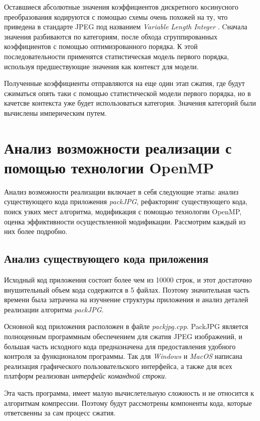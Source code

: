\documentclass{matmex-diploma-custom}
\begin{document}
Оставшиеся абсолютные значения коэффициентов дискретного косинусного преобразования кодируются с помощью схемы очень похожей на ту, что  приведена в стандарте JPEG под  названием \emph{Variable Length Integer} \cite{jpeg-spec}. Cначала значения разбиваются по категориям, после обхода сгруппированных коэффициентов с помощью оптимизрованного порядка. К этой  последовательности применятся статистическая модель первого порядка, используя предшествующие значения как контекст для модели.

Полученные коэффициенты отправляются на еще один этап сжатия, где будут сжиматься опять таки с помощью статистической модели первого порядка, но в качетсве контекста уже будет использоваться категория. Значения категорий были вычислены империческим путем.




\section{Анализ возможности реализации с помощью технологии OpenMP}
Анализ возможности  реализации включает в себя следующие этапы: анализ существующего кода приложения \emph{packJPG}, рефакторинг существующего кода, поиск узких мест алгоритма, модификация с помощью технологии OpenMP, оценка эффиктивности осуществленной модификации. Рассмотрим каждый из них более подробно.

\subsection{Анализ существующего кода приложения}
Исходный код приложения состоит более чем из 10000 строк, и этот достаточно внушительный объем кода содержится в 5 файлах. Поэтому значительная часть времени была затрачена на изучнение структуры приложения и анализ деталей реализации алгоритма \emph{packJPG}.

Основной код приложения расположен в файле \emph{packjpg.cpp}. PackJPG является полноценным программным обеспечением для сжатия JPEG изображений, и большая часть исходного кода предназначена для предоставления удобного контроля за функционалом программы. Так для \emph{Windows} и \emph{MacOS} написана реализация графического пользовательского интерфейса, а также для всех платформ реализован \emph{интерфейс командной строки}.

  Эта часть программа, имеет малую вычислетельную сложность и не относится к алгоритмам компрессии. Поэтому будут рассмотрены компоненты кода, которые ответсвенны за сам процесс сжатия.
\end{document}
